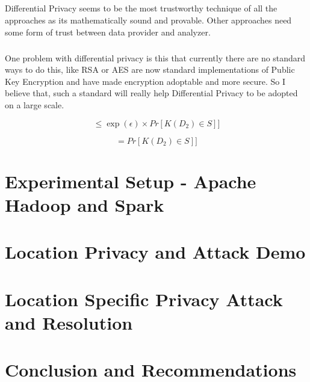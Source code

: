\documentclass{report}
\begin{document}
\paragraph{}
Differential Privacy seems to be the most trustworthy technique of all the approaches as its mathematically sound and provable. Other approaches need some form of trust between data provider and analyzer.
\paragraph{}
One problem with differential privacy is this that currently there are no standard ways to do this, like RSA or AES are now standard implementations of Public Key Encryption and have made encryption adoptable and more secure. So I believe that, such a standard will really help Differential Privacy to be adopted on a large scale.



\newcommand{\dd}[1]{\mathrm{d}#1}

\begin{equation}
[Pr[\mathit{K}(D_{1})\in S] \leq \exp (\epsilon ) \times Pr[\mathit{K}(D_{2})\in S]] \end{equation}

\begin{equation}
[Pr[\mathit{K}(D_{1})\in S]  = Pr[\mathit{K}(D_{2})\in S]]
\end{equation}


\chapter{Experimental Setup - Apache Hadoop and Spark}




\chapter{Location Privacy and Attack Demo }

\chapter{Location Specific Privacy Attack and Resolution}




\chapter{Conclusion and Recommendations}




\end{document}
